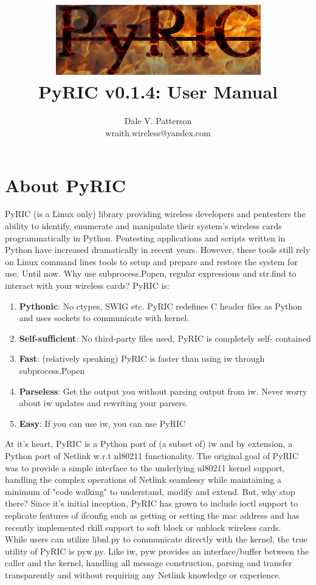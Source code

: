 \documentclass[11pt]{article}
\title{\includegraphics[scale=1]{logo}\\ PyRIC v0.1.4: User Manual}
\author{Dale V. Patterson\\ wraith.wireless@yandex.com}
\begin{document}
\maketitle
\tableofcontents

\section{About PyRIC}\label{sec:About}
PyRIC (is a Linux only) library providing wireless developers and pentesters the
ability to identify, enumerate and manipulate their system's wireless cards
programmatically in Python. Pentesting applications and scripts written in Python
have increased dramatically in recent years. However, these tools still rely on
Linux command lines tools to setup and prepare and restore the system for use.
Until now. Why use subprocess.Popen, regular expressions and str.find to interact
with your wireless cards? PyRIC is:
\begin{enumerate}
\item \textbf{Pythonic}: No ctypes, SWIG etc. PyRIC redefines C header files as 
Python and uses sockets to communicate with kernel.
\item \textbf{Self-sufficient}: No third-party files used, PyRIC is completely self-
contained
\item \textbf{Fast}: (relatively speaking) PyRIC is faster than using iw through 
subprocess.Popen
\item \textbf{Parseless}: Get the output you without parsing output from iw. Never 
worry about iw updates and rewriting your parsers.
\item \textbf{Easy}: If you can use iw, you can use PyRIC
\end{enumerate}

At it's heart, PyRIC is a Python port of (a subset of) iw and by extension, a
Python port of Netlink w.r.t nl80211 functionality. The original goal of PyRIC
was to provide a simple interface to the underlying nl80211 kernel support,
handling the complex operations of Netlink seamlessy while maintaining a minimum
of "code walking" to understand, modify and extend. But, why stop there? Since
it's initial inception, PyRIC has grown to include ioctl support to replicate
features of ifconfig such as getting or setting the mac address and has recently
implemented rkill support to soft block or unblock wireless cards.\\

While users can utilize libnl.py to communicate directly with the kernel, the
true utility of PyRIC is pyw.py. Like iw, pyw provides an interface/buffer 
between the caller and the kernel, handling all message construction, parsing 
and transfer transparently and without requiring any Netlink knowledge or 
experience. \\
\end{document}
